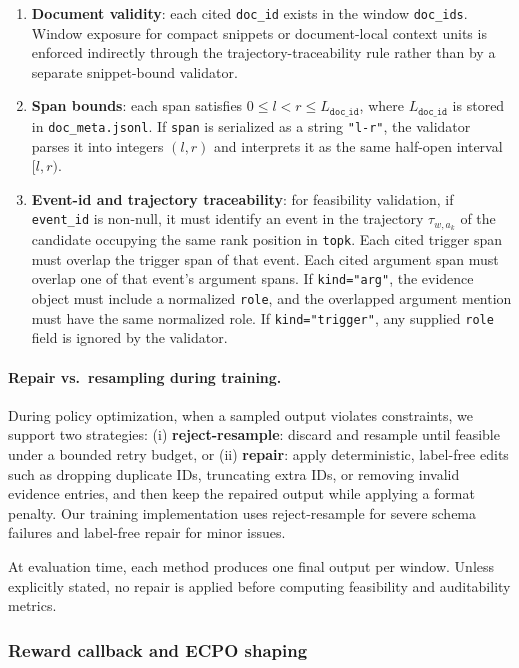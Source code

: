 \documentclass{article}
\begin{document}
\begin{enumerate}
    \item \textbf{Document validity}: each cited \texttt{doc\_id} exists in the window \texttt{doc\_ids}.
    Window exposure for compact snippets or document-local context units is enforced indirectly through the trajectory-traceability rule rather than by a separate snippet-bound validator.
    \item \textbf{Span bounds}: each span satisfies $0\le l < r \le L_{\texttt{doc\_id}}$, where $L_{\texttt{doc\_id}}$ is stored in \texttt{doc\_meta.jsonl}. 
    If \texttt{span} is serialized as a string \texttt{"l-r"}, the validator parses it into integers $(l,r)$ and interprets it as the same half-open interval $[l,r)$.
    \item \textbf{Event-id and trajectory traceability}: for feasibility validation, if \texttt{event\_id} is non-null, it must identify an event in the trajectory $\tau_{w,a_k}$ of the candidate occupying the same rank position in \texttt{topk}.
    Each cited trigger span must overlap the trigger span of that event.
    Each cited argument span must overlap one of that event's argument spans.
    If \texttt{kind="arg"}, the evidence object must include a normalized \texttt{role}, and the overlapped argument mention must have the same normalized role.
    If \texttt{kind="trigger"}, any supplied \texttt{role} field is ignored by the validator.
\end{enumerate}

\paragraph{Repair vs.\ resampling during training.}
During policy optimization, when a sampled output violates constraints, we support two strategies:
(i) \textbf{reject-resample}: discard and resample until feasible under a bounded retry budget, or
(ii) \textbf{repair}: apply deterministic, label-free edits such as dropping duplicate IDs, truncating extra IDs, or removing invalid evidence entries, and then keep the repaired output while applying a format penalty.
Our training implementation uses reject-resample for severe schema failures and label-free repair for minor issues.

At evaluation time, each method produces one final output per window.
Unless explicitly stated, no repair is applied before computing feasibility and auditability metrics.

\subsubsection{Reward callback and ECPO shaping}
\label{sec:app_rl_reward}
\end{document}
